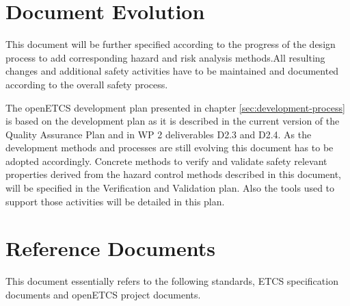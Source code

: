 \documentclass{template/openetcs_report}
\begin{document}
\section{Document Evolution}

This document will be further specified according to the progress of the design process to add corresponding hazard and risk analysis methods.All resulting changes and additional safety activities have to be maintained and documented according to the overall safety process. 

The openETCS development plan presented in chapter \ref{sec:development-process} is based on the development plan as it is described in the current version of the Quality Assurance Plan and in WP 2 deliverables D2.3 and D2.4. As the development methods and processes are still evolving this document has to be adopted accordingly. Concrete methods to verify and validate safety relevant properties derived from the hazard control methods described in this document, will be specified in the Verification and Validation plan. Also the tools used to support those activities will be detailed in this plan.

\section{Reference Documents}
\label{sec:refdoc}

This document essentially refers to the following standards, ETCS specification documents and openETCS project documents.
\end{document}

